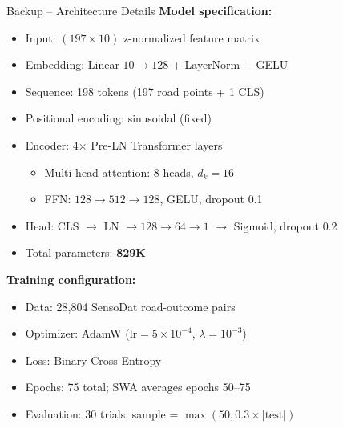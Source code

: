 \documentclass[aspectratio=169,10pt]{beamer}
\begin{document}
\appendix

\begin{frame}[allowframebreaks]{Backup -- Architecture Details}
  \textbf{Model specification:}
  \vspace{4pt}
  \begin{itemize}
    \item Input: $(197{\times}10)$ z-normalized feature matrix
    \item Embedding: Linear $10\to128$ + LayerNorm + GELU
    \item Sequence: 198 tokens (197 road points + 1 CLS)
    \item Positional encoding: sinusoidal (fixed)
    \item Encoder: 4$\times$ Pre-LN Transformer layers
      \begin{itemize}
        \item Multi-head attention: 8 heads, $d_k=16$
        \item FFN: $128\to512\to128$, GELU, dropout 0.1
      \end{itemize}
    \item Head: CLS $\to$ LN $\to 128\to64\to1$ $\to$ Sigmoid, dropout 0.2
    \item Total parameters: \textbf{829K}
  \end{itemize}

  \vspace{6pt}
  \textbf{Training configuration:}
  \begin{itemize}
    \item Data: 28,804 SensoDat road-outcome pairs
    \item Optimizer: AdamW ($\text{lr}=5{\times}10^{-4}$, $\lambda=10^{-3}$)
    \item Loss: Binary Cross-Entropy
    \item Epochs: 75 total; SWA averages epochs 50--75
    \item Evaluation: 30 trials, sample = $\max(50, 0.3{\times}|\text{test}|)$
  \end{itemize}
\end{frame}
\end{document}
